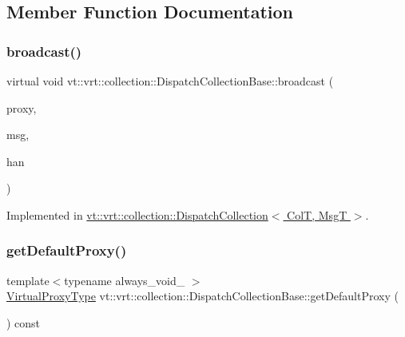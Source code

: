 \subsection{Member Function Documentation}
\mbox{\label{structvt_1_1vrt_1_1collection_1_1_dispatch_collection_base_a339eda5b1ee045a9ec400d34bf91ac97}} 
\subsubsection{\texorpdfstring{broadcast()}{broadcast()}}
{\footnotesize\ttfamily virtual void vt\+::vrt\+::collection\+::\+Dispatch\+Collection\+Base\+::broadcast (\begin{DoxyParamCaption}\item[{\hyperlink{namespacevt_a1b417dd5d684f045bb58a0ede70045ac}{Virtual\+Proxy\+Type}}]{proxy,  }\item[{void $\ast$}]{msg,  }\item[{\hyperlink{namespacevt_af64846b57dfcaf104da3ef6967917573}{Handler\+Type}}]{han }\end{DoxyParamCaption})\hspace{0.3cm}{\ttfamily [pure virtual]}}



Implemented in \hyperlink{structvt_1_1vrt_1_1collection_1_1_dispatch_collection_a3f109eb8fdd56e3292b674243996bca4}{vt\+::vrt\+::collection\+::\+Dispatch\+Collection$<$ Col\+T, Msg\+T $>$}.

\mbox{\label{structvt_1_1vrt_1_1collection_1_1_dispatch_collection_base_a7ff0d68977083eb225da837b6a8cef7d}} 
\subsubsection{\texorpdfstring{get\+Default\+Proxy()}{getDefaultProxy()}}
{\footnotesize\ttfamily template$<$typename always\+\_\+void\+\_\+ $>$ \\
\hyperlink{namespacevt_a1b417dd5d684f045bb58a0ede70045ac}{Virtual\+Proxy\+Type} vt\+::vrt\+::collection\+::\+Dispatch\+Collection\+Base\+::get\+Default\+Proxy (\begin{DoxyParamCaption}{ }\end{DoxyParamCaption}) const}

